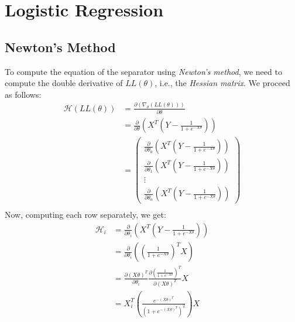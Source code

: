 \documentclass[11pt]{article}
\begin{document}
\section{Logistic Regression}

\subsection{Newton's Method}
To compute the equation of the separator using \textit{Newton's method}, we need to compute the double derivative of $LL(\theta)$, i.e., the \textit{Hessian matrix}. We proceed as follows:
\begin{equation}
    \begin{split}
        \mathcal{H}(LL(\theta)) &= \frac{\partial\left(\nabla_\theta(LL(\theta))\right)}{\partial\theta}\\
        &= \frac{\partial}{\partial\theta}\left(X^T\left(Y - \frac{1}{1+e^{-X\theta}}\right)\right)\\
        &=
        \begin{pmatrix}
            \frac{\partial}{\partial\theta_0}\left(X^T\left(Y - \frac{1}{1+e^{-X\theta}}\right)\right)\\
            \frac{\partial}{\partial\theta_1}\left(X^T\left(Y - \frac{1}{1+e^{-X\theta}}\right)\right)\\
            \vdots\\
            \frac{\partial}{\partial\theta_n}\left(X^T\left(Y - \frac{1}{1+e^{-X\theta}}\right)\right)
        \end{pmatrix}\\
    \end{split}
\end{equation}
Now, computing each row separately, we get:
\begin{equation}
    \begin{split}
        \mathcal{H}_i &= \frac{\partial}{\partial\theta_i}\left(X^T\left(Y - \frac{1}{1+e^{-X\theta}}\right)\right)\\
        &= \frac{\partial}{\partial\theta_i}\left(\left(\frac{1}{1+e^{-X\theta}}\right)^T X\right)\\ %
        &= \frac{\partial(X\theta)^T}{\partial\theta_i}\frac{\partial\left(\frac{1}{1+e^{-X\theta}}\right)^T}{\partial(X\theta)^T} X\\ %
        &= X_i^T \left(\frac{e^{-(X\theta)^T}}{\left(1+e^{-(X\theta)^T}\right)^2}\right) X %
    \end{split}
\end{equation}
\end{document}
